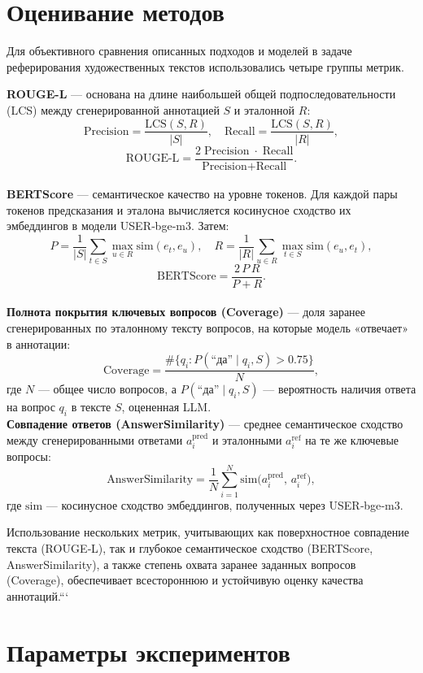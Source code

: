 \documentclass{article}
\theoremstyle{definition}
\theoremstyle{plain}
\begin{document}
\section*{Оценивание методов}

Для объективного сравнения описанных подходов и моделей в задаче реферирования художественных текстов использовались четыре группы метрик.

\textbf{ROUGE-L} — основана на длине наибольшей общей подпоследовательности (LCS) между сгенерированной аннотацией $S$ и эталонной $R$:
    \[
      \text{Precision} = \frac{\mathrm{LCS}(S,R)}{|S|},\quad
      \text{Recall} = \frac{\mathrm{LCS}(S,R)}{|R|},
    \]
    \[
      \text{ROUGE‑L} = \frac{2\;\text{Precision}\;\cdot\;\text{Recall}}{\text{Precision} + \text{Recall}}.
    \]
\\ \textbf{BERTScore} — семантическое качество на уровне токенов. Для каждой пары токенов предсказания и эталона вычисляется косинусное сходство их эмбеддингов в модели USER‑bge‑m3. Затем:
    \[
      P = \frac{1}{|S|}\sum_{t\in S}\max_{u\in R}\!\mathrm{sim}(e_t, e_u),\quad
      R = \frac{1}{|R|}\sum_{u\in R}\max_{t\in S}\!\mathrm{sim}(e_u, e_t),
    \]
    \[
      \text{BERTScore} = \frac{2\,P\,R}{P+R}.
    \]
\\ \textbf{Полнота покрытия ключевых вопросов (Coverage)} — доля заранее сгенерированных по эталонному тексту вопросов, на которые модель «отвечает» в аннотации:
    \[
      \text{Coverage} = \frac{\#\{q_i\colon P(\text{“да”}\mid q_i,S)\!>\!0.75\}}{N},
    \]
    где $N$ — общее число вопросов, а $P(\text{“да”}\mid q_i,S)$ — вероятность наличия ответа на вопрос $q_i$ в тексте $S$, оцененная LLM.
\\ \textbf{Совпадение ответов (AnswerSimilarity)} — среднее семантическое сходство между сгенерированными ответами $a_i^{\text{pred}}$ и эталонными $a_i^{\text{ref}}$ на те же ключевые вопросы:
    \[
      \text{AnswerSimilarity}
      = \frac{1}{N}\sum_{i=1}^N \mathrm{sim}\bigl(a_i^{\text{pred}},\,a_i^{\text{ref}}\bigr),
    \]
    где $\mathrm{sim}$ — косинусное сходство эмбеддингов, полученных через USER‑bge‑m3.


Использование нескольких метрик, учитывающих как поверхностное совпадение текста (ROUGE‑L), так и глубокое семантическое сходство (BERTScore, AnswerSimilarity), а также степень охвата заранее заданных вопросов (Coverage), обеспечивает всестороннюю и устойчивую оценку качества аннотаций.```

\section*{Параметры экспериментов}
\end{document}
